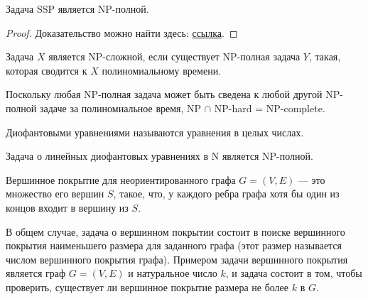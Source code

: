     \begin{Thm}
        Задача SSP является NP-полной.
    \end{Thm}
    
    \begin{proof}
        Доказательство можно найти здесь:
        \href{https://neerc.ifmo.ru/wiki/index.php?title=NP-%D0%BF%D0%BE%D0%BB%D0%BD%D0%BE%D1%82%D0%B0_%D0%B7%D0%B0%D0%B4%D0%B0%D1%87%D0%B8_%D0%BE_%D1%81%D1%83%D0%BC%D0%BC%D0%B5_%D0%BF%D0%BE%D0%B4%D0%BC%D0%BD%D0%BE%D0%B6%D0%B5%D1%81%D1%82%D0%B2%D0%B0}{ссылка}.
    \end{proof}

    
    
    \begin{Def}
         Задача $X$ является NP-сложной, если существует NP-полная задача $Y$, такая, которая сводится к $X$ полиномиальному времени.
    \end{Def}
    
    \begin{Rem}
        Поскольку любая NP-полная задача может быть сведена к любой другой NP-полной задаче за полиномиальное время, 
        NP $\cap$ NP-hard = NP-complete.
    \end{Rem}
    
    \begin{Def}
        Диофантовыми уравнениями называются уравнения в целых числах.
    \end{Def}
    
    \begin{Thm}
        Задача о линейных диофантовых уравнениях в N является NP-полной.
    \end{Thm}

    
    
    \begin{Def}
        Вершинное покрытие для неориентированного графа $G=(V,E)$ --- это множество его вершин $S$, такое, что, у каждого ребра графа хотя бы один из концов входит в вершину из $S$.
    \end{Def}
    
    \begin{Def}
        В общем случае, задача о вершинном покрытии состоит в поиске вершинного покрытия наименьшего размера для заданного графа (этот размер называется числом вершинного покрытия графа). Примером задачи вершинного покрытия является граф $G=(V, E)$ и натуральное число $k$, и задача состоит в том, чтобы проверить, существует ли вершинное покрытие размера не более $k$ в $G$.
    \end{Def}
    
